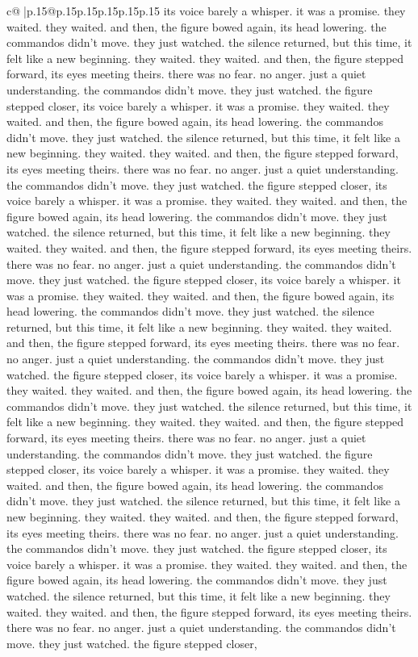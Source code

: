 \documentclass{article}
\begin{document}
{\begin{supertabular}{c@{$\;$}|p{.15\linewidth}@{}p{.15\linewidth}p{.15\linewidth}p{.15\linewidth}p{.15\linewidth}p{.15\linewidth}}
{{{its voice barely a whisper. it was a promise. they waited. they waited. and then, the figure bowed again, its head lowering. the commandos didn't move. they just watched. the silence returned, but this time, it felt like a new beginning. they waited. they waited. and then, the figure stepped forward, its eyes meeting theirs. there was no fear. no anger. just a quiet understanding. the commandos didn't move. they just watched. the figure stepped closer, its voice barely a whisper. it was a promise. they waited. they waited. and then, the figure bowed again, its head lowering. the commandos didn't move. they just watched. the silence returned, but this time, it felt like a new beginning. they waited. they waited. and then, the figure stepped forward, its eyes meeting theirs. there was no fear. no anger. just a quiet understanding. the commandos didn't move. they just watched. the figure stepped closer, its voice barely a whisper. it was a promise. they waited. they waited. and then, the figure bowed again, its head lowering. the commandos didn't move. they just watched. the silence returned, but this time, it felt like a new beginning. they waited. they waited. and then, the figure stepped forward, its eyes meeting theirs. there was no fear. no anger. just a quiet understanding. the commandos didn't move. they just watched. the figure stepped closer, its voice barely a whisper. it was a promise. they waited. they waited. and then, the figure bowed again, its head lowering. the commandos didn't move. they just watched. the silence returned, but this time, it felt like a new beginning. they waited. they waited. and then, the figure stepped forward, its eyes meeting theirs. there was no fear. no anger. just a quiet understanding. the commandos didn't move. they just watched. the figure stepped closer, its voice barely a whisper. it was a promise. they waited. they waited. and then, the figure bowed again, its head lowering. the commandos didn't move. they just watched. the silence returned, but this time, it felt like a new beginning. they waited. they waited. and then, the figure stepped forward, its eyes meeting theirs. there was no fear. no anger. just a quiet understanding. the commandos didn't move. they just watched. the figure stepped closer, its voice barely a whisper. it was a promise. they waited. they waited. and then, the figure bowed again, its head lowering. the commandos didn't move. they just watched. the silence returned, but this time, it felt like a new beginning. they waited. they waited. and then, the figure stepped forward, its eyes meeting theirs. there was no fear. no anger. just a quiet understanding. the commandos didn't move. they just watched. the figure stepped closer, its voice barely a whisper. it was a promise. they waited. they waited. and then, the figure bowed again, its head lowering. the commandos didn't move. they just watched. the silence returned, but this time, it felt like a new beginning. they waited. they waited. and then, the figure stepped forward, its eyes meeting theirs. there was no fear. no anger. just a quiet understanding. the commandos didn't move. they just watched. the figure stepped closer, }}}
\end{supertabular}}
\end{document}
